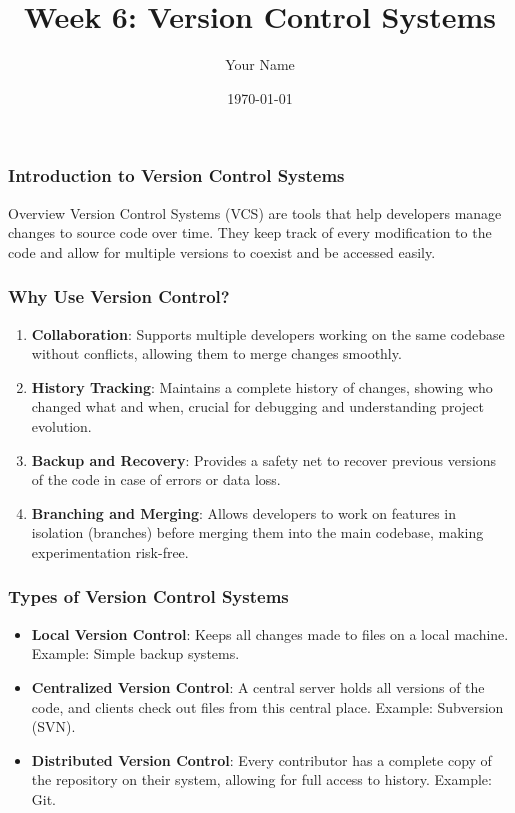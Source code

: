 \documentclass{beamer}
\title{Week 6: Version Control Systems}
\author{Your Name}
\institute{Your Institution}
\date{\today}
\begin{document}
\frame{\titlepage}

\begin{frame}[fragile]
    \frametitle{Introduction to Version Control Systems}
    \begin{block}{Overview}
        Version Control Systems (VCS) are tools that help developers manage changes to source code over time. They keep track of every modification to the code and allow for multiple versions to coexist and be accessed easily.
    \end{block}
\end{frame}

\begin{frame}[fragile]
    \frametitle{Why Use Version Control?}
    \begin{enumerate}
        \item \textbf{Collaboration}: Supports multiple developers working on the same codebase without conflicts, allowing them to merge changes smoothly.
        \item \textbf{History Tracking}: Maintains a complete history of changes, showing who changed what and when, crucial for debugging and understanding project evolution.
        \item \textbf{Backup and Recovery}: Provides a safety net to recover previous versions of the code in case of errors or data loss.
        \item \textbf{Branching and Merging}: Allows developers to work on features in isolation (branches) before merging them into the main codebase, making experimentation risk-free.
    \end{enumerate}
\end{frame}

\begin{frame}[fragile]
    \frametitle{Types of Version Control Systems}
    \begin{itemize}
        \item \textbf{Local Version Control}: Keeps all changes made to files on a local machine. Example: Simple backup systems.
        \item \textbf{Centralized Version Control}: A central server holds all versions of the code, and clients check out files from this central place. Example: Subversion (SVN).
        \item \textbf{Distributed Version Control}: Every contributor has a complete copy of the repository on their system, allowing for full access to history. Example: Git.
    \end{itemize}
\end{frame}
\end{document}
